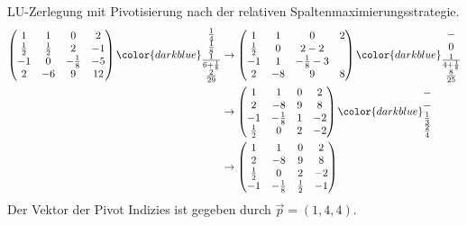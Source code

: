 \begin{bspn}
LU-Zerlegung mit Pivotisierung nach der relativen Spaltenmaximierungsstrategie.
\begin{align*}
\begin{pmatrix}
1 & 1 & 0 & 2\\
\frac{1}{2} & \frac{1}{2} & 2 & -1\\
-1 & 0 & -\frac{1}{8} & -5\\
2 & -6 & 9 & 12
\end{pmatrix}
{\color{darkblue}
\begin{matrix}
\frac{1}{4} \\ \frac{1}{8} \\ \frac{1}{6+\frac{1}{8}} \\ \frac{2}{29}
\end{matrix}}
&\rightarrow
\begin{pmatrix}
1 & 1 & 0 & 2\\
\frac{1}{2} & 0 & 2 -2\\
-1 & 1 & -\frac{1}{8} -3\\
2 & - 8 & 9 & 8
\end{pmatrix}
{\color{darkblue}
\begin{matrix}
- \\ 0 \\ \frac{1}{4+\frac{1}{8}} \\ \frac{8}{25}
\end{matrix}}\\
&\rightarrow
\begin{pmatrix}
1 & 1 & 0 & 2\\
2 & - 8 & 9 & 8\\
-1 & -\frac{1}{8} & 1 &-2\\
\frac{1}{2} & 0 & 2 & -2
\end{pmatrix}
{\color{darkblue}
\begin{matrix}
- \\ - \\ \frac{1}{3} \\ \frac{2}{4}
\end{matrix}}\\
&\rightarrow
\begin{pmatrix}
1 & 1 & 0 & 2\\
2 & -8 & 9 & 8\\
\frac{1}{2} & 0 & 2 & -2\\
-1 & -\frac{1}{8} &\frac{1}{2} &-1
\end{pmatrix}
\end{align*}
Der Vektor der Pivot Indizies ist gegeben durch $\vec{p} = (1, 4, 4)$.\bsphere
\end{bspn}


